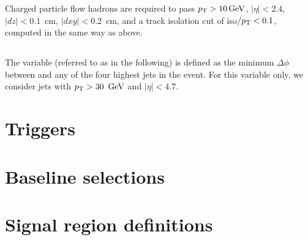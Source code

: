 Charged particle flow hadrons are required to pass $p_{\mathrm{T}}>10\,\text{Ge\hspace{-.08em}V}$, $|\eta|<2.4$, $|dz|<0.1$~cm,
$|dxy|<0.2$~cm, and a track isolation cut of iso$/p_{\mathrm{T}}<0.1$, computed in the same way as above.

\subsection{\dphimet}
The variable \dphimet (referred to as \dpmin in the following) is defined as the minimum $\Delta\phi$ between
\vMet and any of the four highest \pt jets in the event. For this variable only, we consider jets with
$p_{\mathrm{T}}>30~\,\text{Ge\hspace{-.08em}V}$ and $|\eta|<4.7$.


\section{Triggers}
\label{sec:triggers}

\section{Baseline selections}
\label{sec:baselinesel}

\section{Signal region definitions}
\label{sec:srdefs}
